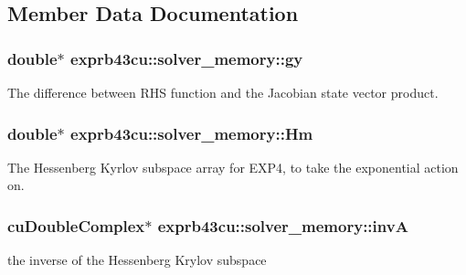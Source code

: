 \subsection{Member Data Documentation}
\subsubsection[{\texorpdfstring{gy}{gy}}]{\setlength{\rightskip}{0pt plus 5cm}double$\ast$ exprb43cu\+::solver\+\_\+memory\+::gy}\hypertarget{structexprb43cu_1_1solver__memory_a020f6e5fb98c3395373e8098c0b726ee}{}\label{structexprb43cu_1_1solver__memory_a020f6e5fb98c3395373e8098c0b726ee}


The difference between R\+HS function and the Jacobian state vector product. 

\subsubsection[{\texorpdfstring{Hm}{Hm}}]{\setlength{\rightskip}{0pt plus 5cm}double$\ast$ exprb43cu\+::solver\+\_\+memory\+::\+Hm}\hypertarget{structexprb43cu_1_1solver__memory_a2ca03f02755ba0786e0460f33542216b}{}\label{structexprb43cu_1_1solver__memory_a2ca03f02755ba0786e0460f33542216b}


The Hessenberg Kyrlov subspace array for E\+X\+P4, to take the exponential action on. 

\subsubsection[{\texorpdfstring{invA}{invA}}]{\setlength{\rightskip}{0pt plus 5cm}cu\+Double\+Complex$\ast$ exprb43cu\+::solver\+\_\+memory\+::invA}\hypertarget{structexprb43cu_1_1solver__memory_a41d0878433e4e8e15ce8403b8efc8c23}{}\label{structexprb43cu_1_1solver__memory_a41d0878433e4e8e15ce8403b8efc8c23}


the inverse of the Hessenberg Krylov subspace 

